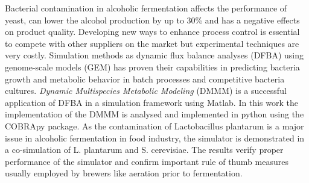 Bacterial contamination in alcoholic fermentation affects the performance of yeast, can lower the
alcohol production by up to 30\% and has a negative effects on product quality.
Developing new ways to enhance process control is essential to compete with other suppliers on the
market but experimental techniques are very costly.
Simulation methods as dynamic flux balance analyses (DFBA) using genome-scale models (GEM) has
proven their capabilities in predicting bacteria growth and metabolic behavior in batch processes
and competitive bacteria cultures. \textit{Dynamic Multispecies Metabolic Modeling} (DMMM)
is a successful application of DFBA in a simulation framework using Matlab. In this work the 
implementation of the DMMM is analysed and implemented in python using the COBRApy package.
As the contamination of Lactobacillus plantarum is a major issue in alcoholic
fermentation in food industry, the simulator is demonstrated in a co-simulation of L. plantarum
and S. cerevisiae. The results verify proper performance of the simulator and confirm important
rule of thumb measures usually employed by brewers like aeration prior to fermentation.
